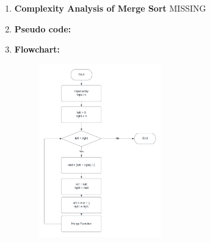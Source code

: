 \documentclass[11pt,a4paper]{article}
\begin{document}
{\begin{enumerate}[label=\textbf{\arabic*})]
					Merge Sort is a Divide and Conquer algorithm. It divides the input array into two halves, calls itself for the two halves, and then it merges the two sorted halves. The merge() function is used for merging two halves. The merge(arr, l, m, r) is a key process that assumes that arr[l..m] and arr[m+1..r] are sorted and merges the two sorted sub-arrays into one
				\\[12pt]
				\item \textbf{Complexity Analysis of Merge Sort}
					MISSING
				\\[12pt]
				\item \textbf{Pseudo code:} 
				\pagebreak
				\item \textbf{Flowchart:}
					\begin{figure}[H]
						\centering 
						\includegraphics[width=0.5\textwidth]{Merge Sort}
					\end{figure}
					

\end{enumerate}}
\end{document}
